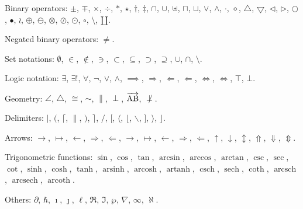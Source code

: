 \noindent Binary operators: $\pm$, $\mp$, $\times$, $\div$, $\ast$, $\star$, $\dagger$, $\ddagger$, $\cap$, $\cup$, $\uplus$, $\sqcap$, $\sqcup$, $\vee$, $\wedge$, $\cdot$, $\diamond$, $\bigtriangleup$, $\bigtriangledown$, $\triangleleft$, $\triangleright$, $\bigcirc$, $\bullet$, $\wr$, $\oplus$, $\ominus$, $\otimes$, $\oslash$, $\odot$, $\circ$, $\setminus$, $\amalg$.

\noindent Negated binary operators: $\neq$.

\noindent Set notations: $\emptyset$, $\in$, $\notin$, $\ni$, $\subset$, $\subseteq$, $\supset$, $\supseteq$, $\cup$, $\cap$, $\setminus$.

\noindent Logic notation: $\exists$, $\exists!$,  $\forall$, $\neg$, $\lor$, $\land$, $\implies$, $\Rightarrow$, $\Longleftarrow$, $\Leftarrow$, $\iff$, $\Leftrightarrow$, $\top$, $\bot$. 

\noindent Geometry:  $\angle$, $\triangle$, $\cong$, $\sim$, $\|$, $\perp$, $\overrightarrow{\rm AB}$, $\not\perp$. 

\noindent Delimiters: $|$, $($,  $\lceil$,  $\|$, $)$, $\rceil$,  $/$, $[$, $\langle$, $\lfloor$,  $\backslash$, $]$, $\rangle$, $\rfloor$.  

\noindent Arrows: $\to$, $\mapsto$, $\gets$, $\Rightarrow$, $\Leftarrow$, $\longrightarrow$, $\longmapsto$, $\longleftarrow$, $\Longrightarrow$, $\Longleftarrow$, $\uparrow$, $\downarrow$, $\updownarrow$, $\Uparrow$, $\Downarrow$, $\Updownarrow$.

\noindent Trigonometric functions: $\sin$, $\cos$, $\tan$, $\arcsin$, $\arccos$, $\arctan$, $\csc$, $\sec$, $\cot$,  $\sinh$, $\cosh$, $\tanh$, $\operatorname{arsinh}$, $\operatorname{arcosh}$, $\operatorname{artanh}$, $\operatorname{csch}$, $\operatorname{sech}$, $\coth$, $\operatorname{arcsch}$, $\operatorname{arcsech}$, $\operatorname{arcoth}$.


\noindent Others: $\partial$,  $\hbar$, $\imath$, $\jmath$, $\ell$, $\Re$, $\Im$, $\wp$, $\nabla$,  $\infty$, $\aleph$.  








\clearpage